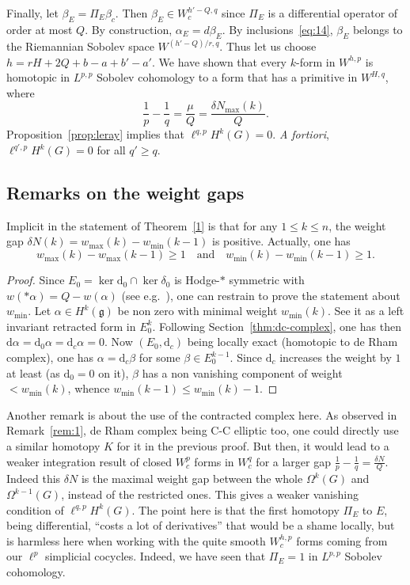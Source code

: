 \documentclass[11pt]{article}
\theoremstyle{definition}
\numberwithin{equation}{section}
\numberwithin{figure}{section}
\numberwithin{table}{section}
\newcommand{\dd}{\mathrm{d}}
\newcommand{\dalpha}{\dd \alpha}
\begin{document}
Finally, let $ \beta_E=\Pi_E \beta_c$. Then $\beta_E\in W_c^{h'-Q,q}$ since $\Pi_E$ is a differential operator of order at most $Q$. By construction, $\alpha_E=d\beta_E$. By inclusions~\eqref{eq:14}, $\beta_E$ belongs to the Riemannian Sobolev space $W^{(h'-Q)/r,q}$. Thus let us choose $h=rH + 2Q+b-a+b'-a'$. We have shown that every $k$-form in $W^{h,p}$ is homotopic in $L^{p,p}$ Sobolev cohomology to a form that has a primitive in $W^{H,q}$, where
\[
\frac{1}{p}-\frac{1}{q}=\frac{\mu}{Q}= \frac{\delta N_{\max}(k)}{Q}.
\]
Proposition~\ref{prop:leray} implies that $\ell^{q,p}H^k(G)=0$. \emph{A fortiori}, $\ell^{q',p}H^k(G)=0$ for all $q'\geq q$.

\subsection{Remarks on the weight gaps}\label{sec:remarks-weight-gaps}

Implicit in the statement of Theorem~\ref{1} is that for any $1\leq k \leq n $, the weight gap $\delta N(k) = w_{\max}(k)- w_{\min}(k-1)$ is positive. Actually, one has
\begin{equation}\label{eq:15}
w_{\max}(k) - w_{\max}(k-1) \geq 1 \quad \mathrm{and}\quad w_{\min}(k) - w_{\min}(k-1) \geq 1.
\end{equation}

\begin{proof}
Since $E_0 = \ker \dd_0 \cap \ker \delta_0$ is Hodge-$*$ symmetric with $w(*\alpha) = Q - w (\alpha)$ (see e.g.~\cite{Rumin_CRAS_1999}), one can restrain to prove the statement about $w_{\min}$. Let $\alpha \in H^{k}(\mathfrak{g})$ be non zero with minimal weight $w_{\min}(k)$. See it as a left invariant retracted form in $E_0^k$. Following Section~\ref{thm:dc-complex}, one has then $\dalpha = \dd_0 \alpha = \dd_c \alpha = 0$. Now $(E_0,\dd_c)$ being locally exact (homotopic to de Rham complex), one has $\alpha = \dd_c \beta$ for some $\beta \in E_0^{k-1}$. Since $\dd_c$ increases the weight by $1$ at least (as $\dd_0=0$ on it), $\beta$ has a non vanishing component of weight $< w_{\min}(k)$, whence $w_{\min}(k-1) \leq w_{\min}(k) -1$.
\end{proof}

Another remark is about the use of the contracted complex here. As observed in Remark~\ref{rem:1}, de Rham complex being C-C elliptic too, one could directly use a similar homotopy $K$ for it in the previous proof. But then, it would lead to a weaker integration result of closed $W_c^p$ forms in $W_c^q$ for a larger gap $\frac{1}{p} - \frac{1}{q} = \frac{\delta N}{Q}$. Indeed this $\delta N $ is the maximal weight gap between the whole $\Omega^k(G)$ and $\Omega^{k-1}(G)$, instead of the restricted ones. This gives a weaker vanishing condition of $\ell^{q,p} H^{k}(G)$. The point here is that the first homotopy $\Pi_E$ to $E$, being differential, ``costs a lot of derivatives'' that would be a shame locally, but is harmless here when working with the quite smooth $W_c^{h,p}$ forms coming from our $\ell^p$ simplicial cocycles. Indeed, we have seen that $\Pi_E = 1$ in $L^{p,p}$ Sobolev cohomology.
\end{document}
